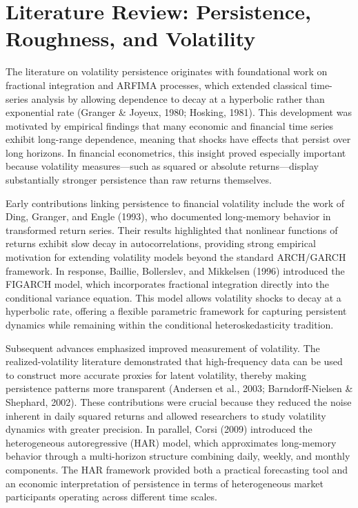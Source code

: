\documentclass[12pt]{article}
\begin{document}
\section{Literature Review: Persistence, Roughness, and Volatility}
\label{sec:lit}

The literature on volatility persistence originates with foundational work on fractional integration and ARFIMA processes, which extended classical time-series analysis by allowing dependence to decay at a hyperbolic rather than exponential rate (Granger \& Joyeux, 1980; Hosking, 1981). This development was motivated by empirical findings that many economic and financial time series exhibit long-range dependence, meaning that shocks have effects that persist over long horizons. In financial econometrics, this insight proved especially important because volatility measures---such as squared or absolute returns---display substantially stronger persistence than raw returns themselves.

Early contributions linking persistence to financial volatility include the work of Ding, Granger, and Engle (1993), who documented long-memory behavior in transformed return series. Their results highlighted that nonlinear functions of returns exhibit slow decay in autocorrelations, providing strong empirical motivation for extending volatility models beyond the standard ARCH/GARCH framework. In response, Baillie, Bollerslev, and Mikkelsen (1996) introduced the FIGARCH model, which incorporates fractional integration directly into the conditional variance equation. This model allows volatility shocks to decay at a hyperbolic rate, offering a flexible parametric framework for capturing persistent dynamics while remaining within the conditional heteroskedasticity tradition.

Subsequent advances emphasized improved measurement of volatility. The realized-volatility literature demonstrated that high-frequency data can be used to construct more accurate proxies for latent volatility, thereby making persistence patterns more transparent (Andersen et al., 2003; Barndorff-Nielsen \& Shephard, 2002). These contributions were crucial because they reduced the noise inherent in daily squared returns and allowed researchers to study volatility dynamics with greater precision. In parallel, Corsi (2009) introduced the heterogeneous autoregressive (HAR) model, which approximates long-memory behavior through a multi-horizon structure combining daily, weekly, and monthly components. The HAR framework provided both a practical forecasting tool and an economic interpretation of persistence in terms of heterogeneous market participants operating across different time scales.
\end{document}
